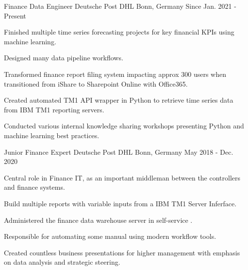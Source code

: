 

\begin{cventries}
\cventry
  {Finance Data Engineer} %
  {Deutsche Post DHL} %
  {Bonn, Germany} %
  {Since Jan. 2021 - Present} %
  {
    \begin{cvitems} %
      \item {Finished multiple time series forecasting projects for key financial KPIs using machine learning.}
      \item {Designed many data pipeline workflows.}
      \item {Transformed finance report filing system impacting approx 300 users when transitioned from iShare to Sharepoint Online with Office365.}
      \item {Created automated TM1 API wrapper in Python to retrieve time series data from IBM TM1 reporting servers.}
      \item {Conducted various internal knowledge sharing workshops presenting Python and machine learning best practices.}
    \end{cvitems}
  }


\cventry
  {Junior Finance Expert} %
  {Deutsche Post DHL} %
  {Bonn, Germany} %
  {May 2018 - Dec. 2020} %
  {
    \begin{cvitems} %
      \item {Central role in Finance IT, as an important middleman between the controllers and finance systems.}
      \item {Build multiple reports with variable inputs from a IBM TM1 Server Inferface.}
      \item {Administered the finance data warehouse server in self-service .}
      \item {Responsible for automating some manual using modern workflow tools.}
      \item {Created countless business presentations for higher management with emphasis on data analysis and strategic steering.}
    \end{cvitems}
  }


\end{cventries}
